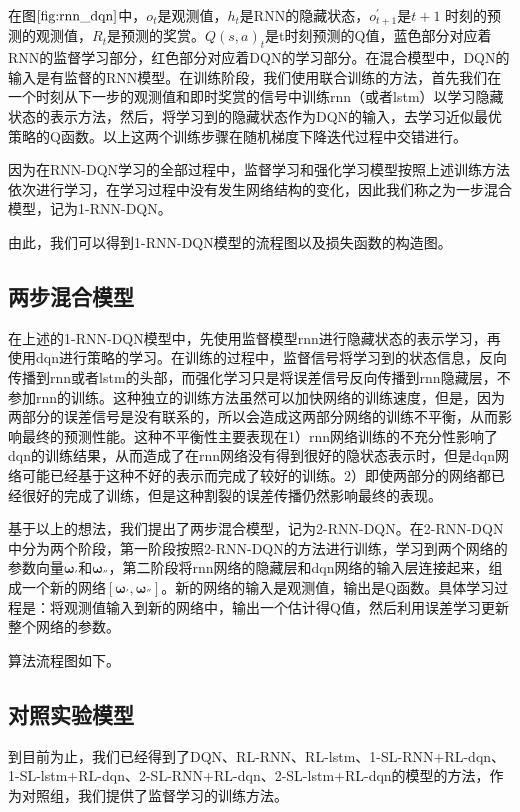 在图$\ref{fig:rnn_dqn}$中，$o_{t}$是观测值，$h_{t}$是RNN的隐藏状态，$o_{t+1}^{'}$是$t+1$ 时刻的预测的观测值，$R_{t}$是预测的奖赏。$Q(s,a)_{t}$是t时刻预测的Q值，蓝色部分对应着RNN的监督学习部分，红色部分对应着DQN的学习部分。在混合模型中，DQN的输入是有监督的RNN模型。在训练阶段，我们使用联合训练的方法，首先我们在一个时刻从下一步的观测值和即时奖赏的信号中训练rnn（或者lstm）以学习隐藏状态的表示方法，然后，将学习到的隐藏状态作为DQN的输入，去学习近似最优策略的Q函数。以上这两个训练步骤在随机梯度下降迭代过程中交错进行。

因为在RNN-DQN学习的全部过程中，监督学习和强化学习模型按照上述训练方法依次进行学习，在学习过程中没有发生网络结构的变化，因此我们称之为一步混合模型，记为1-RNN-DQN。

由此，我们可以得到1-RNN-DQN模型的流程图以及损失函数的构造图。

\subsection{两步混合模型}
在上述的1-RNN-DQN模型中，先使用监督模型rnn进行隐藏状态的表示学习，再使用dqn进行策略的学习。在训练的过程中，监督信号将学习到的状态信息，反向传播到rnn或者lstm的头部，而强化学习只是将误差信号反向传播到rnn隐藏层，不参加rnn的训练。这种独立的训练方法虽然可以加快网络的训练速度，但是，因为两部分的误差信号是没有联系的，所以会造成这两部分网络的训练不平衡，从而影响最终的预测性能。这种不平衡性主要表现在1）rnn网络训练的不充分性影响了dqn的训练结果，从而造成了在rnn网络没有得到很好的隐状态表示时，但是dqn网络可能已经基于这种不好的表示而完成了较好的训练。2）即使两部分的网络都已经很好的完成了训练，但是这种割裂的误差传播仍然影响最终的表现。

基于以上的想法，我们提出了两步混合模型，记为2-RNN-DQN。在2-RNN-DQN中分为两个阶段，第一阶段按照2-RNN-DQN的方法进行训练，学习到两个网络的参数向量$\mathbf{\omega_{'}}$和$\mathbf{\omega_{''}}$，第二阶段将rnn网络的隐藏层和dqn网络的输入层连接起来，组成一个新的网络$[\mathbf{\omega_{'}},\mathbf{\omega_{''}}]$。新的网络的输入是观测值，输出是Q函数。具体学习过程是：将观测值输入到新的网络中，输出一个估计得Q值，然后利用误差学习更新整个网络的参数。

算法流程图如下。

\subsection{对照实验模型}

到目前为止，我们已经得到了DQN、RL-RNN、RL-lstm、1-SL-RNN+RL-dqn、1-SL-lstm+RL-dqn、2-SL-RNN+RL-dqn、2-SL-lstm+RL-dqn的模型的方法，作为对照组，我们提供了监督学习的训练方法。

